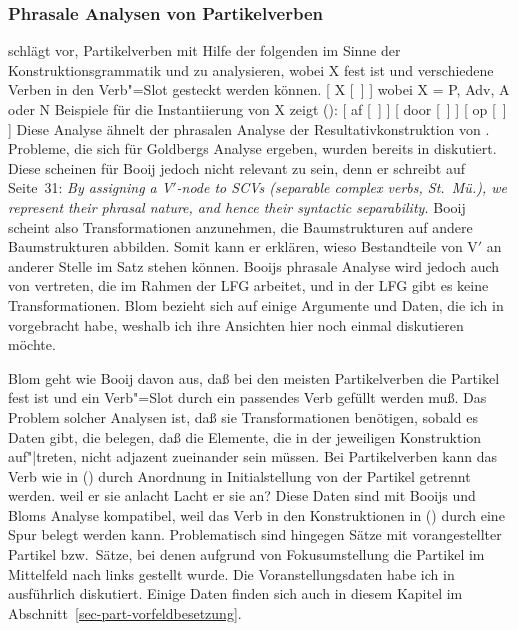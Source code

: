 \subsubsection{Phrasale Analysen von Partikelverben}
\label{sec-phrasal-pv}

\citet[Abschnitt~2]{Booij2002a} schlägt vor, Partikelverben mit Hilfe der folgenden \Konstruktion im
Sinne der Konstruktionsgrammatik und
\citet{Jackendoff97a}
zu analysieren, wobei X fest ist und verschiedene Verben in den
Verb"=Slot gesteckt werden können.
\ea
{}[ X [~] ] wobei X = P, Adv, A oder N
\z
Beispiele für die Instantiierung von X zeigt ():
\eal
\label{particle-konstruktionen}
\ex {}[ af   [~] ]
\ex {}[ door [~] ]
\ex {}[ op   [~] ]
\zl 
Diese Analyse ähnelt der phrasalen Analyse der Resultativkonstruktion von
\citet{Goldberg95a}. Probleme, die sich für Goldbergs Analyse ergeben,
wurden bereits in 
diskutiert. Diese scheinen für Booij jedoch nicht relevant zu sein,
denn er schreibt auf Seite~31: \emph{By assigning a V$'$-node to SCVs (separable complex verbs, St.\ Mü.),
we represent their phrasal nature, and hence their syntactic separability.} Booij
scheint also Transformationen anzunehmen, die Baumstrukturen
auf andere Baumstrukturen abbilden. Somit kann er erklären, wieso Bestandteile
von V$'$ an anderer Stelle im Satz stehen können.
Booijs phrasale Analyse wird jedoch auch von \citet{Blom2005a} vertreten,
die im Rahmen der LFG arbeitet,
und in der LFG gibt es keine Transformationen. Blom bezieht sich auf einige Argumente und Daten, 
die ich in 
vorgebracht habe, weshalb ich ihre Ansichten hier noch einmal diskutieren möchte.

Blom geht wie Booij davon aus, daß bei den meisten Partikelverben die Partikel fest ist und 
ein Verb"=Slot durch ein passendes Verb gefüllt werden muß. Das Problem solcher Analysen ist,
daß sie Transformationen benötigen, sobald es Daten gibt, die belegen, daß die Elemente,
die in der jeweiligen Konstruktion auf"|treten, nicht adjazent zueinander sein müssen. Bei Partikelverben
kann das Verb wie in () durch Anordnung in Initialstellung von der Partikel getrennt werden.
\eal
\ex weil er sie anlacht
\ex Lacht er sie an?
\zl
Diese Daten sind mit Booijs und Bloms Analyse kompatibel, weil das Verb in den Konstruktionen
in () durch eine Spur belegt werden kann. Problematisch sind hingegen Sätze mit vorangestellter
Partikel bzw.\ Sätze, bei denen aufgrund von Fokusumstellung die Partikel im Mittelfeld nach
links gestellt wurde. Die Voranstellungsdaten habe ich in  
ausführlich diskutiert. Einige Daten finden sich auch in diesem Kapitel im Abschnitt~\ref{sec-part-vorfeldbesetzung}.

